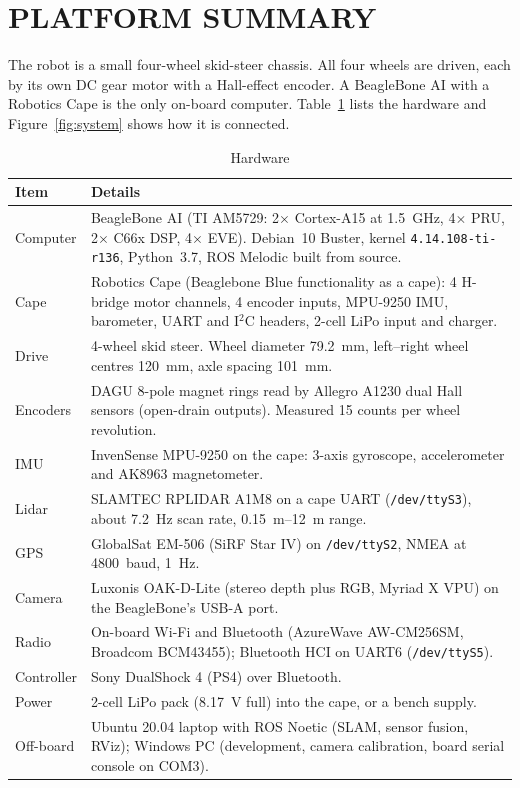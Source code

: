 \section{PLATFORM SUMMARY}

The robot is a small four-wheel skid-steer chassis. All four wheels are
driven, each by its own DC gear motor with a Hall-effect encoder. A BeagleBone
AI with a Robotics Cape is the only on-board computer. Table~\ref{tab:hw}
lists the hardware and Figure~\ref{fig:system} shows how it is connected.

\begin{table}[htbp]
\centering
\caption{Hardware}
\label{tab:hw}
\small
\begin{tabularx}{\linewidth}{>{\raggedright\arraybackslash}p{1.35in}X}
\toprule
Item & Details \\
\midrule
Computer & BeagleBone AI (TI AM5729: 2$\times$ Cortex-A15 at \SI{1.5}{GHz},
  4$\times$ PRU, 2$\times$ C66x DSP, 4$\times$ EVE). Debian~10 Buster,
  kernel \texttt{4.14.108-ti-r136}, Python~3.7, ROS Melodic built from source. \\
Cape & Robotics Cape (Beaglebone Blue functionality as a cape): 4 H-bridge
  motor channels, 4 encoder inputs, MPU-9250 IMU, barometer, UART and I$^2$C
  headers, 2-cell LiPo input and charger. \\
Drive & 4-wheel skid steer. Wheel diameter \SI{79.2}{mm}, left--right wheel
  centres \SI{120}{mm}, axle spacing \SI{101}{mm}. \\
Encoders & DAGU 8-pole magnet rings read by Allegro A1230 dual Hall sensors
  (open-drain outputs). Measured \num{15} counts per wheel revolution. \\
IMU & InvenSense MPU-9250 on the cape: 3-axis gyroscope, accelerometer and
  AK8963 magnetometer. \\
Lidar & SLAMTEC RPLIDAR A1M8 on a cape UART (\texttt{/dev/ttyS3}), about
  \SI{7.2}{Hz} scan rate, \SIrange{0.15}{12}{m} range. \\
GPS & GlobalSat EM-506 (SiRF Star IV) on \texttt{/dev/ttyS2}, NMEA at
  \SI{4800}{baud}, \SI{1}{Hz}. \\
Camera & Luxonis OAK-D-Lite (stereo depth plus RGB, Myriad X VPU) on the
  BeagleBone's USB-A port. \\
Radio & On-board Wi-Fi and Bluetooth (AzureWave AW-CM256SM, Broadcom BCM43455);
  Bluetooth HCI on UART6 (\texttt{/dev/ttyS5}). \\
Controller & Sony DualShock 4 (PS4) over Bluetooth. \\
Power & 2-cell LiPo pack (\SI{8.17}{V} full) into the cape, or a bench supply. \\
Off-board & Ubuntu 20.04 laptop with ROS Noetic (SLAM, sensor fusion, RViz);
  Windows PC (development, camera calibration, board serial console on COM3). \\
\bottomrule
\end{tabularx}
\end{table}

